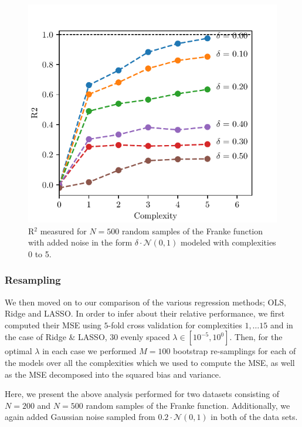 \documentclass[reprint, english, nofootinbib]{revtex4-2}
\begin{document}
\begin{figure}[h!tb]
    \center
    \includegraphics[width=\columnwidth]{OLS_R2_noise.pdf}
    \caption{R$^2$ measured for $N=500$ random samples of the Franke function with added noise in the form $\delta\cdot\mathcal N(0, 1)$ modeled with complexities 0 to 5.}
    \label{fig:r2_vs_noise}
\end{figure}


\subsubsection{Resampling}
\noindent
We then moved on to our comparison of the various regression methods; OLS, Ridge and LASSO. In order to infer about their relative performance, we first computed their MSE using $5$-fold cross validation for complexities $1, \dots 15$ and in the case of Ridge \& LASSO, 30 evenly spaced $\lambda \in [10^{-5}, 10^{0}]$. Then, for the optimal $\lambda$ in each case we performed $M=100$ bootstrap re-samplings for each of the models over all the complexities which we used to compute the MSE, as well as the MSE decomposed into the squared bias and variance.

Here, we present the above analysis performed for two datasets consisting of $N=200$ and $N=500$ random samples of the Franke function. Additionally, we again added Gaussian noise sampled from $0.2 \cdot \mathcal N(0,1)$ in both of the data sets.
\end{document}
